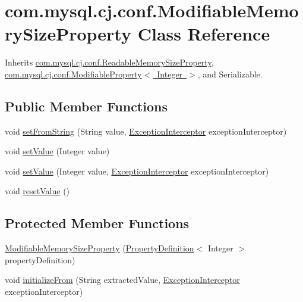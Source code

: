 \hypertarget{classcom_1_1mysql_1_1cj_1_1conf_1_1_modifiable_memory_size_property}{}\section{com.\+mysql.\+cj.\+conf.\+Modifiable\+Memory\+Size\+Property Class Reference}
\label{classcom_1_1mysql_1_1cj_1_1conf_1_1_modifiable_memory_size_property}


Inherits \mbox{\hyperlink{classcom_1_1mysql_1_1cj_1_1conf_1_1_readable_memory_size_property}{com.\+mysql.\+cj.\+conf.\+Readable\+Memory\+Size\+Property}}, \mbox{\hyperlink{interfacecom_1_1mysql_1_1cj_1_1conf_1_1_modifiable_property}{com.\+mysql.\+cj.\+conf.\+Modifiable\+Property$<$ Integer $>$}}, and Serializable.

\subsection*{Public Member Functions}
\begin{DoxyCompactItemize}
\item 
void \mbox{\hyperlink{classcom_1_1mysql_1_1cj_1_1conf_1_1_modifiable_memory_size_property_afd540074a822236f5461b7a89ec49bd3}{set\+From\+String}} (String value, \mbox{\hyperlink{interfacecom_1_1mysql_1_1cj_1_1exceptions_1_1_exception_interceptor}{Exception\+Interceptor}} exception\+Interceptor)
\item 
void \mbox{\hyperlink{classcom_1_1mysql_1_1cj_1_1conf_1_1_modifiable_memory_size_property_ad59087614f7875248e28ca184945853b}{set\+Value}} (Integer value)
\item 
void \mbox{\hyperlink{classcom_1_1mysql_1_1cj_1_1conf_1_1_modifiable_memory_size_property_aa7aaac2a1212ab395eb104b928c71012}{set\+Value}} (Integer value, \mbox{\hyperlink{interfacecom_1_1mysql_1_1cj_1_1exceptions_1_1_exception_interceptor}{Exception\+Interceptor}} exception\+Interceptor)
\item 
void \mbox{\hyperlink{classcom_1_1mysql_1_1cj_1_1conf_1_1_modifiable_memory_size_property_a2118b2d1d11e66304f167ab020efb64c}{reset\+Value}} ()
\end{DoxyCompactItemize}
\subsection*{Protected Member Functions}
\begin{DoxyCompactItemize}
\item 
\mbox{\hyperlink{classcom_1_1mysql_1_1cj_1_1conf_1_1_modifiable_memory_size_property_a8c539df40fdc2f01f6b87657be07de89}{Modifiable\+Memory\+Size\+Property}} (\mbox{\hyperlink{interfacecom_1_1mysql_1_1cj_1_1conf_1_1_property_definition}{Property\+Definition}}$<$ Integer $>$ property\+Definition)
\item 
void \mbox{\hyperlink{classcom_1_1mysql_1_1cj_1_1conf_1_1_modifiable_memory_size_property_aceb3ed567e0a632125e731f9690d3277}{initialize\+From}} (String extracted\+Value, \mbox{\hyperlink{interfacecom_1_1mysql_1_1cj_1_1exceptions_1_1_exception_interceptor}{Exception\+Interceptor}} exception\+Interceptor)
\end{DoxyCompactItemize}
